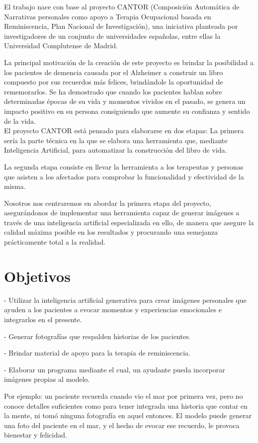 El trabajo nace con base al proyecto CANTOR (Composición Automática de Narrativas personales como apoyo a Terapia Ocupacional basada en Reminiscencia, Plan Nacional de Investigación), una iniciativa planteada por investigadores de un conjunto de universidades españolas, entre ellas la Universidad Complutense de Madrid.

La principal motivación de la creación de este proyecto es brindar la posibilidad a los pacientes de demencia causada por el Alzheimer a construir un libro compuesto por sus recuerdos más felices, brindándole la oportunidad de rememorarlos. Se ha demostrado que cuando los pacientes hablan sobre determinadas épocas de su vida y momentos vividos en el pasado, se genera un impacto positivo en su persona consiguiendo que aumente su confianza y sentido de la vida.\\

El proyecto CANTOR está pensado para elaborarse en dos etapas: 
La primera sería la parte técnica en la que se elabora una herramienta que, mediante Inteligencia Artificial, para automatizar la construcción del libro de vida. 

La segunda etapa consiste en llevar la herramienta a los terapeutas y personas que asisten a los afectados para comprobar la funcionalidad y efectividad de la misma. 

Nosotros nos centraremos en abordar la primera etapa del proyecto, asegurándonos de implementar una herramienta capaz de generar imágenes a través de una inteligencia artificial especializada en ello, de manera que asegure la calidad máxima posible en los resultados y procurando una semejanza prácticamente total a la realidad.\\


\section{Objetivos}

- Utilizar la inteligencia artificial generativa para crear imágenes personales que ayuden a los pacientes a evocar momentos y experiencias emocionales e integrarlos en el presente.

- Generar fotografías que respalden historias de los pacientes.

- Brindar material de apoyo para la terapia de reminiscencia.

- Elaborar un programa mediante el cual, un ayudante pueda incorporar imágenes propias al modelo.

Por ejemplo: un paciente recuerda cuando vio el mar por primera vez, pero no conoce detalles suficientes como para tener integrada una historia que contar en la mente, ni tomó ninguna fotografía en aquel entonces. El modelo puede generar una foto del paciente en el mar, y el hecho de evocar ese recuerdo, le provoca bienestar y felicidad.

